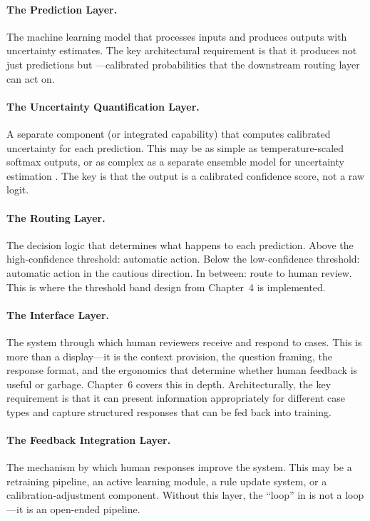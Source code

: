 \paragraph{The Prediction Layer.} The machine learning model that processes inputs and produces outputs with uncertainty estimates. The key architectural requirement is that it produces not just predictions but ---calibrated probabilities that the downstream routing layer can act on.

\paragraph{The Uncertainty Quantification Layer.} A separate component (or integrated capability) that computes calibrated uncertainty for each prediction. This may be as simple as temperature-scaled softmax outputs, or as complex as a separate ensemble model for uncertainty estimation \autocite{lakshminarayanan2017simple}. The key is that the output is a calibrated confidence score, not a raw logit.

\paragraph{The Routing Layer.} The decision logic that determines what happens to each prediction. Above the high-confidence threshold: automatic action. Below the low-confidence threshold: automatic action in the cautious direction. In between: route to human review. This is where the threshold band design from Chapter~4 is implemented.

\paragraph{The Interface Layer.} The system through which human reviewers receive and respond to cases. This is more than a display---it is the context provision, the question framing, the response format, and the ergonomics that determine whether human feedback is useful or garbage. Chapter~6 covers this in depth. Architecturally, the key requirement is that it can present information appropriately for different case types and capture structured responses that can be fed back into training.

\paragraph{The Feedback Integration Layer.} The mechanism by which human responses improve the system. This may be a retraining pipeline, an active learning module, a rule update system, or a calibration-adjustment component. Without this layer, the ``loop'' in \hitl is not a loop---it is an open-ended pipeline.

